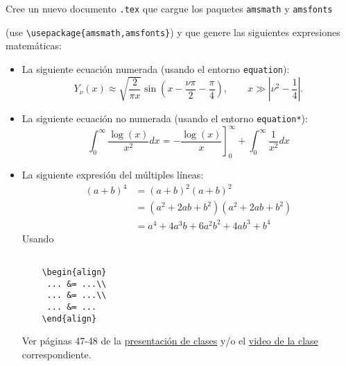 \documentclass[11pt]{exam}
\begin{document}
\begin{questions}

\item Cree un nuevo documento \texttt{.tex} que cargue los paquetes \texttt{amsmath} y \texttt{amsfonts} 

(use \verb|\usepackage{amsmath,amsfonts}|) y que genere las siguientes expresiones matemáticas:
\begin{itemize}

\item La siguiente ecuación numerada (usando el entorno \texttt{equation}):
\begin{equation}\label{asinNnu}
Y_\nu(x)\approx \sqrt{\frac{2}{\pi x}}\sin\left(x-\frac{\nu\pi}{2}-\frac{\pi}{4}\right), 
\qquad x\gg\left|\nu^2-\frac{1}{4}\right|.
\end{equation}

\item La siguiente ecuación no numerada (usando el entorno \texttt{equation*}):
\begin{equation*}
\int_{0}^{\infty }\frac{\log (x)}{x^{2}}dx=-\left. \frac{\log (x)}{x}\right]
_{0}^{\infty }+\int_{0}^{\infty }\frac{1}{x^{2}}dx
\end{equation*}

\item La siguiente expresión del múltiples líneas:
\begin{align} 
(a+b)^4 &= (a+b)^2 (a+b)^2 \\
 &= (a^2+2ab+b^2) (a^2+2ab+b^2) \\
 &= a^4+4 a^3 b + 6 a^2 b^2 +4 a b^3 +b^4
\end{align}
Usando

\begin{verbatim}

	\begin{align} 
	 ... &= ...\\
	 ... &= ...\\
	 ... &= ...
	\end{align} 
\end{verbatim}

Ver páginas 47-48 de la \href{https://udec.instructure.com/courses/62342/pages/latex-pdf-presentacion?module_item_id=2334210}{presentación de clases} y/o el \href{https://udec.instructure.com/courses/62342/pages/clase-28-04?module_item_id=2422455}{video de la clase} correspondiente.


\end{itemize}
\end{questions}
\end{document}
